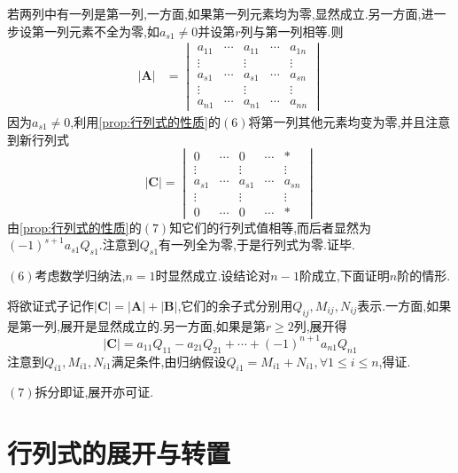 \begin{green}
\begin{Proof}
    若两列中有一列是第一列,一方面,如果第一列元素均为零,显然成立.另一方面,进一步设第一列元素不全为零,如$a_{s1}\neq 0$并设第$r$列与第一列相等.则\begin{align*}
        \left|\bm{A}\right|&=\begin{vmatrix}
            a_{11}&\cdots&a_{11}&\cdots&a_{1n}\\
            \vdots& &\vdots& &\vdots\\
            a_{s1}&\cdots&a_{s1}&\cdots&a_{sn}\\
            \vdots& &\vdots& &\vdots\\
            a_{n1}&\cdots&a_{n1}&\cdots&a_{nn}
        \end{vmatrix}
    \end{align*}
    \vfill
    因为$a_{s1}\neq 0$,利用\cref{prop:行列式的性质}的$(6)$将第一列其他元素均变为零,并且注意到新行列式
    \[
    \left|\bm{C}\right|=\begin{vmatrix}
        0&\cdots&0&\cdots&*\\
        \vdots& &\vdots& &\vdots\\
        a_{s1}&\cdots&a_{s1}&\cdots&a_{sn}\\
        \vdots& &\vdots& &\vdots\\
        0&\cdots&0&\cdots&*
    \end{vmatrix}
    \]由\cref{prop:行列式的性质}的$(7)$知它们的行列式值相等,而后者显然为$\displaystyle
    \left(-1\right)^{s+1}a_{s1}Q_{s1}$.注意到$Q_{s1}$有一列全为零,于是行列式为零.证毕.

    $(6)$考虑数学归纳法,$n=1$时显然成立.设结论对$n-1$阶成立,下面证明$n$阶的情形.

    将欲证式子记作$\left|\bm{C}\right|=\left|\bm{A}\right|+\left|\bm{B}\right|$,它们的余子式分别用$Q_{ij},M_{ij},N_{ij}$表示.一方面,如果是第一列,展开是显然成立的.另一方面,如果是第$r\geqslant 2$列,展开得\[
    \left|\bm{C}\right|=a_{11}Q_{11}-a_{21}Q_{21}+\cdots+(-1)^{n+1}a_{n1}Q_{n1}
    \]注意到$Q_{i1},M_{i1},N_{i1}$满足条件,由归纳假设$Q_{i1}=M_{i1}+N_{i1},\forall 1\leqslant i\leqslant n$,得证.

    $(7)$拆分即证,展开亦可证.\qedhere
\end{Proof}
\end{green}
\newpage
\section{行列式的展开与转置}

